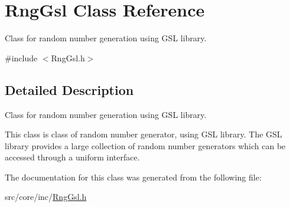 \hypertarget{class_rng_gsl}{\section{Rng\-Gsl Class Reference}
\label{class_rng_gsl}
}


Class for random number generation using G\-S\-L library.  




{\ttfamily \#include $<$Rng\-Gsl.\-h$>$}



\subsection{Detailed Description}
Class for random number generation using G\-S\-L library. 

This class is class of random number generator, using G\-S\-L library. The G\-S\-L library provides a large collection of random number generators which can be accessed through a uniform interface. 

The documentation for this class was generated from the following file\-:\begin{DoxyCompactItemize}
\item 
src/core/inc/\hyperlink{_rng_gsl_8h}{Rng\-Gsl.\-h}\end{DoxyCompactItemize}
